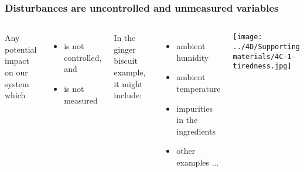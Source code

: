\begin{frame}\frametitle{Disturbances are uncontrolled and unmeasured variables}
	
	\begin{columns}[T]
			Any potential impact on our system which
			\begin{itemize}
				\item	is not controlled, and
		
				\item	is not measured
			\end{itemize}
			
			\vspace{1cm}
			In the ginger biscuit example, it might include:
			\begin{itemize}
				\item	ambient humidity
				\item	ambient temperature
				\item	impurities in the ingredients
				\item	other examples ...
			\end{itemize}
		
			\texttt{[image: ../4D/Supporting materials/4C-1-tiredness.jpg]}
	\end{columns}
\end{frame}

